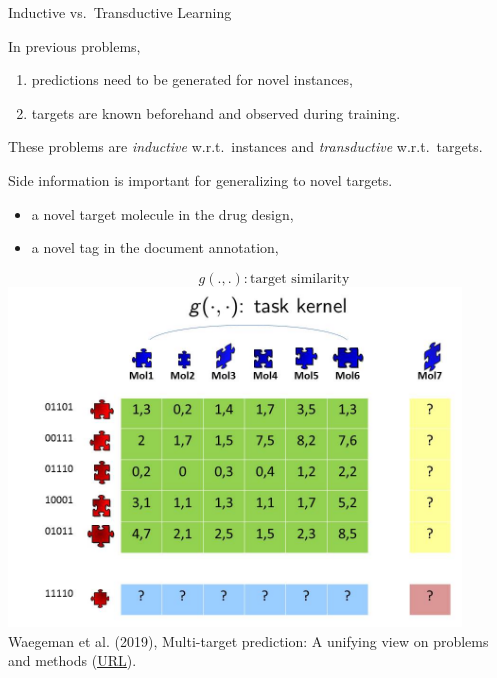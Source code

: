 \documentclass[11pt,compress,t,notes=noshow, xcolor=table]{beamer}
\begin{document}
\begin{frame}{Inductive vs.\ Transductive Learning}
	\begin{itemize} 
		\item In previous problems, 
		\begin{enumerate}
			\item predictions need to be generated for novel instances, 
			\item targets are known beforehand and observed during training.
		\end{enumerate}
		\item These problems are \emph{inductive} w.r.t.\ instances and \emph{transductive} w.r.t.\ targets.

		\begin{minipage}{0.45\textwidth}    
			\item Side information is important for generalizing to novel targets.
            \begin{itemize}
                \item a novel target molecule in the drug design,
                \item a novel tag in the document annotation,
            \end{itemize} 
		\end{minipage}
        \hfill
		\begin{minipage}{0.45\textwidth}    
			\begin{center}
			
				\tiny{$$\qquad g(.,.): \mbox{target similarity}$$}
				\includegraphics[width=0.9\textwidth,trim = 0 0 0 50,clip]{figure/Slide7}  \tiny
				\\ Waegeman et al. (2019), Multi-target prediction:
				A unifying view on problems and methods (\href{https://arxiv.org/pdf/1809.02352.pdf}{\underline{URL}}).
	
			\end{center}
		\end{minipage}
	\end{itemize}
\end{frame}
\end{document}
